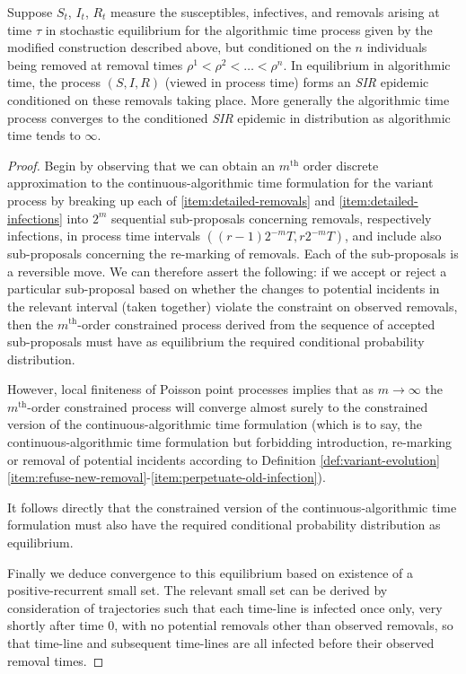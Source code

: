 \documentclass[]{article}
\newcommand{\SIR}{\emph{SIR}\xspace}
\begin{document}
\begin{thm}\label{thm:conditioned-SIR-epidemic}
Suppose \({S}_t\), \({I}_t\), \({R}_t\) measure the susceptibles, infectives, and removals 
arising at time \(\tau\) in stochastic equilibrium for the algorithmic time process given by the modified construction described above,
but conditioned on the \(n\) individuals being removed at removal times \(\rho^1<\rho^2<\ldots<\rho^n\).
In equilibrium in algorithmic time,
the process \(({S}, {I}, {R})\) (viewed in process time) forms an \SIR epidemic conditioned on these removals taking place.
More generally
the algorithmic time process 
converges to the conditioned \SIR epidemic in distribution as algorithmic time tends to \(\infty\).
\end{thm}
\begin{proof}
Begin by observing that we can obtain
an \(m^\text{th}\) order discrete approximation
to the continuous-algorithmic time formulation 
for the variant process by breaking up each of \ref{item:detailed-removals}
and \ref{item:detailed-infections} into \(2^m\) sequential
sub-proposals concerning removals, respectively
infections, in process time intervals
\(((r{-}1)2^{-m}T, r 2^{-m}T)\),
and include also sub-proposals concerning the re-marking of removals. 
Each of the sub-proposals is a reversible move.
We can therefore assert the following:
if we accept or reject a 
particular sub-proposal based on whether the changes to potential
incidents in the relevant interval
(taken together) violate the constraint
on observed removals, then the
\(m^\text{th}\)-order constrained process derived
from the sequence of accepted sub-proposals
must have as equilibrium the required
conditional probability distribution.

However, local finiteness of Poisson point processes implies that as \(m\to\infty\)
the \(m^\text{th}\)-order constrained process will converge almost surely to the constrained version
of the continuous-algorithmic time formulation 
(which is to say,
the continuous-algorithmic time formulation 
but forbidding introduction, re-marking or removal of potential incidents
according to
Definition \ref{def:variant-evolution}\ref{item:refuse-new-removal}-\ref{item:perpetuate-old-infection}).

It follows directly that the constrained version
of the continuous-algorithmic time formulation 
 must also have the required
conditional probability distribution as equilibrium.

Finally we deduce convergence to this
equilibrium based on existence of a 
positive-recurrent small set. 
The relevant small set can be derived by consideration of trajectories such that each time-line is infected once only, 
very shortly after time \(0\), with no potential removals other than observed removals, so that time-line 
and subsequent time-lines are all infected before their observed removal times.
\end{proof}
\end{document}
